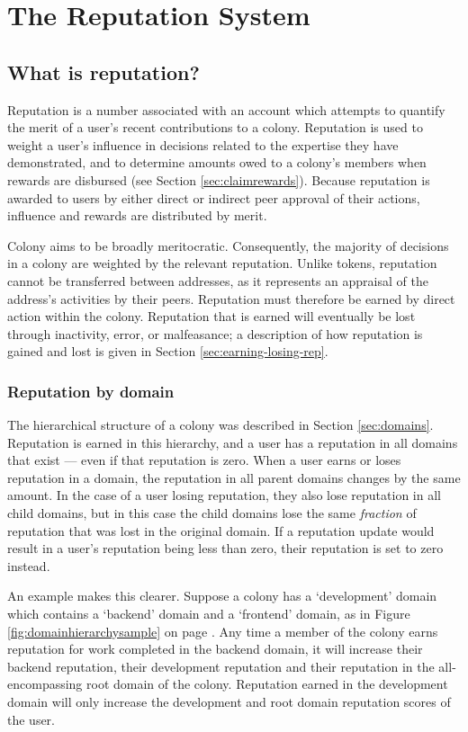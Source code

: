 \section{The Reputation System}\label{sec:reputation}
\subsection{What is reputation?}\label{subsec:what-is-reputation}

Reputation is a number associated with an account which attempts to quantify the merit of a user's recent contributions to a colony. Reputation is used to weight a user's influence in decisions related to the expertise they have demonstrated, and to determine amounts owed to a colony's members when rewards are disbursed (see Section \ref{sec:claimrewards}). Because reputation is awarded to users by either direct or indirect peer approval of their actions, influence and rewards are distributed by merit.

Colony aims to be broadly meritocratic. Consequently, the majority of decisions in a colony are weighted by the relevant reputation. Unlike tokens, reputation cannot be transferred between addresses, as it represents an appraisal of the address's activities by their peers. Reputation must therefore be earned by direct action within the colony. Reputation that is earned will eventually be lost through inactivity, error, or malfeasance; a description of how reputation is gained and lost is given in Section \ref{sec:earning-losing-rep}.

\subsubsection{Reputation by domain}\label{sec:rep-by-domain}
The hierarchical structure of a colony was described in Section \ref{sec:domains}. Reputation is earned in this hierarchy, and a user has a reputation in all domains that exist --- even if that reputation is zero. When a user earns or loses reputation in a domain, the reputation in all parent domains changes by the same amount. In the case of a user losing reputation, they also lose reputation in all child domains, but in this case the child domains lose the same \textit{fraction} of reputation that was lost in the original domain. If a reputation update would result in a user's reputation being less than zero, their reputation is set to zero instead.

An example makes this clearer. Suppose a colony has a `development' domain which contains a `backend' domain and a `frontend' domain, as in Figure \ref{fig:domainhierarchysample} on page \pageref{fig:domainhierarchysample}. Any time a member of the colony earns reputation for work completed in the backend domain, it will increase their backend reputation, their development reputation and their reputation in the all-encompassing root domain of the colony. Reputation earned in the development domain will only increase the development and root domain reputation scores of the user.

